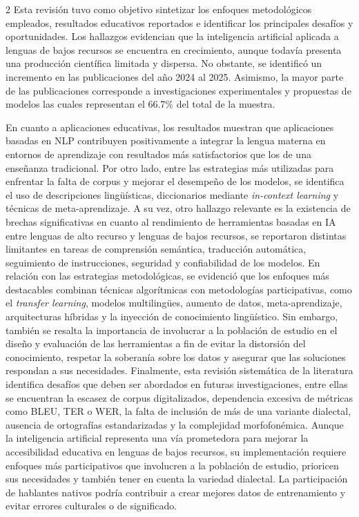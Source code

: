 \documentclass[12pt,twoside,titlepage]{ingenius}
\begin{document}
\begin{multicols}{2}
Esta revisión tuvo como objetivo sintetizar los enfoques metodológicos empleados, resultados educativos reportados e identificar los principales desafíos y oportunidades. Los hallazgos evidencian que la inteligencia artificial aplicada a lenguas de bajos recursos se encuentra en crecimiento, aunque todavía presenta una producción científica limitada y dispersa. No obstante, se identificó un incremento en las publicaciones del año 2024 al 2025. Asimismo, la mayor parte de las publicaciones corresponde a investigaciones experimentales y propuestas de modelos las cuales representan el 66.7\% del total de la muestra. 

En cuanto a aplicaciones educativas, los resultados muestran que aplicaciones basadas en NLP contribuyen positivamente a integrar la lengua materna en entornos de aprendizaje con resultados más satisfactorios que los de una enseñanza tradicional. Por otro lado, entre las estrategias más utilizadas para enfrentar la falta de corpus y mejorar el desempeño de los modelos, se identifica el uso de descripciones lingüísticas, diccionarios mediante \textit{in-context learning} y técnicas de meta-aprendizaje. A su vez, otro hallazgo relevante es la existencia de brechas significativas en cuanto al rendimiento de herramientas basadas en IA entre lenguas de alto recurso y lenguas de bajos recursos, se reportaron distintas limitantes en tareas de comprensión semántica, traducción automática, seguimiento de instrucciones, seguridad y confiabilidad de los modelos.
En relación con las estrategias metodológicas, se evidenció que los enfoques más destacables combinan técnicas algorítmicas con metodologías participativas, como el \textit{transfer learning}, modelos multilingües, aumento de datos, meta-aprendizaje, arquitecturas híbridas y la inyección de conocimiento lingüístico. Sin embargo, también se resalta la importancia de involucrar a la población de estudio en el diseño y evaluación de las herramientas a fin de evitar la distorsión del conocimiento, respetar la soberanía sobre los datos y asegurar que las soluciones respondan a sus necesidades.
Finalmente, esta revisión sistemática de la literatura identifica desafíos que deben ser abordados en futuras investigaciones, entre ellas se encuentran la escasez de corpus digitalizados, dependencia excesiva de métricas como BLEU, TER o WER, la falta de inclusión de más de una variante dialectal, ausencia de ortografías estandarizadas y la complejidad morfofonémica. Aunque la inteligencia artificial representa una vía prometedora para mejorar la accesibilidad educativa en lenguas de bajos recursos, su implementación requiere enfoques más participativos que involucren a la población de estudio, prioricen sus necesidades y también tener en cuenta la variedad dialectal. La participación de hablantes nativos podría contribuir a crear mejores datos de entrenamiento y evitar errores culturales o de significado.


\end{multicols}
\end{document}
